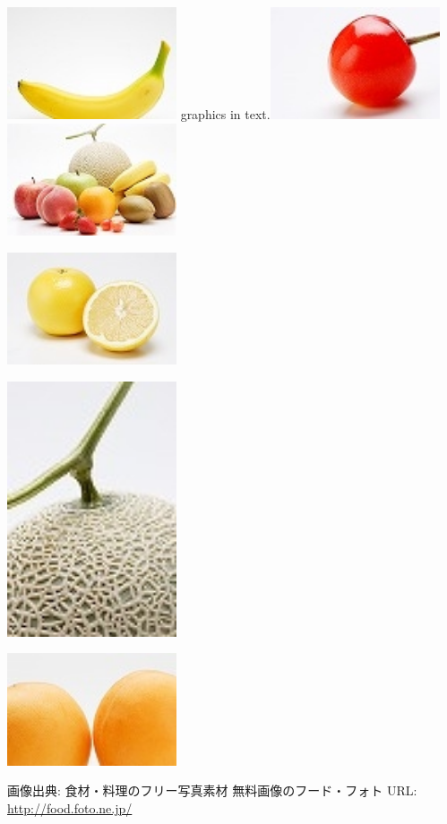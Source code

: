 \documentclass{jsarticle}
\begin{document}
\includegraphics[width=5cm]{banana.jpg} graphics in text.\includegraphics[width=5cm]{cherry.jpg} \includegraphics[width=5cm]{fruits.jpg}

\includegraphics[width=5cm]{grapefruits.jpg}

\includegraphics[width=5cm]{melon.jpg}

\includegraphics[width=5cm]{orange.jpg}

\vspace{4zw}

画像出典: 食材・料理のフリー写真素材 無料画像のフード・フォト URL: \url{http://food.foto.ne.jp/}
\end{document}
